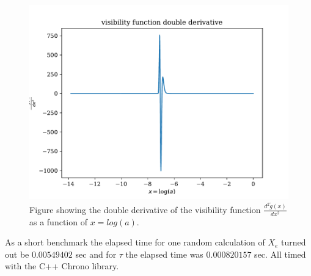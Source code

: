 \documentclass[onecolumn]{aastex62}
\begin{document}
\begin{figure}
    \includegraphics[scale=0.8]{figures/ddgdxx.pdf}
    \caption{Figure showing the double derivative of the visibility function $\frac{d^2\widetilde{g}(x)}{dx^2}$ as a function of $x=log(a)$.}
    \label{fig:ddgdxx}
\end{figure}
As a short benchmark the elapsed time for one random calculation of $X_e$ turned out be $0.00549402$ sec and for $\tau$ the elapsed time was $0.000820157$ sec. All timed with the C++ Chrono library.
\end{document}
